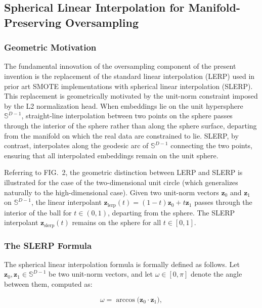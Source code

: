 \documentclass[12pt,letterpaper]{article}
\newcommand{\bz}{\mathbf{z}}
\begin{document}
\subsection{Spherical Linear Interpolation for Manifold-Preserving Oversampling}

\subsubsection{Geometric Motivation}

The fundamental innovation of the oversampling component of the present
invention is the replacement of the standard linear interpolation (LERP) used
in prior art SMOTE implementations with spherical linear interpolation (SLERP).
This replacement is geometrically motivated by the unit-norm constraint imposed
by the L2 normalization head. When embeddings lie on the unit hypersphere
$\mathbb{S}^{D-1}$, straight-line interpolation between two points on the
sphere passes through the interior of the sphere rather than along the sphere
surface, departing from the manifold on which the real data are constrained to
lie. SLERP, by contrast, interpolates along the geodesic arc of $\mathbb{S}^{D-1}$
connecting the two points, ensuring that all interpolated embeddings remain on
the unit sphere.

Referring to FIG.\ 2, the geometric distinction between LERP and SLERP is
illustrated for the case of the two-dimensional unit circle (which generalizes
naturally to the high-dimensional case). Given two unit-norm vectors $\bz_0$
and $\bz_1$ on $\mathbb{S}^{D-1}$, the linear interpolant $\bz_{\text{lerp}}(t)
= (1-t)\bz_0 + t\bz_1$ passes through the interior of the ball for $t \in
(0,1)$, departing from the sphere. The SLERP interpolant $\bz_{\text{slerp}}(t)$
remains on the sphere for all $t \in [0,1]$.

\subsubsection{The SLERP Formula}

The spherical linear interpolation formula is formally defined as follows.
Let $\bz_0, \bz_1 \in \mathbb{S}^{D-1}$ be two unit-norm vectors, and let
$\omega \in [0, \pi]$ denote the angle between them, computed as:

\begin{equation}
  \omega = \arccos\!\bigl(\bz_0 \cdot \bz_1\bigr),
  \label{eq:omega}
\end{equation}
\end{document}
